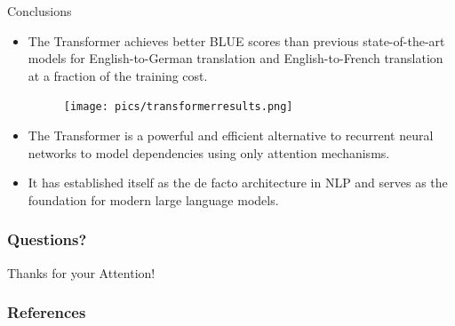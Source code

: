 \documentclass[handout]{beamer}
\begin{document}
\begin{frame}{Conclusions}
\begin{scriptsize}
\begin{itemize}

 \item The Transformer achieves better BLUE scores than previous state-of-the-art models for English-to-German translation and English-to-French translation at a fraction of the training cost.

      \begin{figure}[h]
        	\texttt{[image: pics/transformerresults.png]}
        \end{figure}  

\item The Transformer is a powerful and efficient alternative to recurrent neural networks to model dependencies using only attention mechanisms.

\item It has established itself as the de facto architecture in NLP and serves as the foundation for modern large language models.
 
\end{itemize}

\end{scriptsize}


\end{frame}

\begin{frame}
\frametitle{Questions?}
\begin{center}\LARGE Thanks for your Attention!\\ \end{center}



\end{frame}

\begin{frame}[allowframebreaks]\scriptsize
\frametitle{References}


%
\end{frame}  


\end{document}
